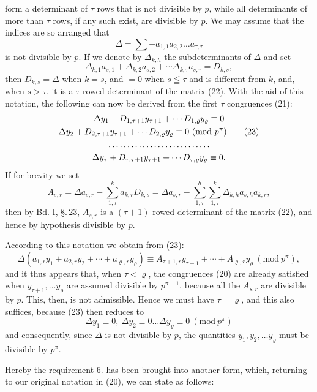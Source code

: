 form a determinant of $\tau$ rows that is not divisible by $p$, while all determinants of more than $\tau$ rows,
if any such exist, are divisible by $p$. We may
assume that the indices are so arranged that
\[
\Delta = \sum \pm a_{1,1}a_{2,2} \dots a_{\tau,\tau}
\]
is not divisible by $p$. If we denote by $\Delta_{k,h}$ the subdeterminants of $\Delta$ and set
\[
\Delta_{k,1}a_{s,1} + \Delta_{k,2}a_{s,2} + \cdots \Delta_{k,\tau}a_{s,\tau} = D_{k,s},
\]
then $D_{k,s} = \Delta$ when $k = s$, and $= 0$ when $s \leqq \tau$ and is different from
$k$, and, when $s > \tau$, it is a $\tau$-rowed determinant of the matrix (22). With the aid of this notation, the following can
now be derived from the first $\tau$ congruences (21):
\begin{gather}
\Delta y_1 + D_{1,\tau+1}y_{\tau+1} + \cdots D_{1,\varrho}y_\varrho \equiv 0 \notag\\
\Delta y_2 + D_{2,\tau+1}y_{\tau+1} + \cdots D_{2,\varrho}y_\varrho \equiv 0\ (\mathrm{mod}\ p^\pi) \tag{23}\\
\dots\dots\dots\dots\dots\dots\dots\dots\dots \notag\\
\Delta y_\tau + D_{\tau,\tau+1}y_{\tau+1} + \cdots D_{\tau,\varrho}y_\varrho \equiv 0. \notag
\end{gather}
If for brevity we set
\[
A_{s,r} = \Delta a_{s,r} - \sum_{1,\tau}^{k} a_{k,r}D_{k,s} = \Delta a_{s,r} - \sum_{1,\tau}^{h}\sum_{1,\tau}^{k} \Delta_{k,h}a_{s,h}a_{k,r},
\]
then by Bd. I, \S.\,23, $A_{s,r}$ is a $(\tau+1)$-rowed determinant of the
matrix (22), and hence by hypothesis divisible by $p$.

    According to this notation we obtain from (23):
\[
\Delta (a_{1,r}y_1 + a_{2,r}y_2 + \cdots + a_{\varrho,r}y_\varrho)
\equiv A_{\tau+1,r}y_{\tau+1} + \cdots + A_{\varrho,r}y_\varrho\ (\mathrm{mod}\ p^\pi),
\]
and it thus appears that, when $\tau < \varrho$, the congruences (20)
are already satisfied when $y_{\tau+1}, \dots y_\varrho$ are assumed divisible by $p^{\pi-1}$, because all the $A_{s,r}$ are divisible by $p$. This,
then, is not admissible. Hence we must have $\tau = \varrho$, and this also
suffices, because (23) then reduces to
\[
\Delta y_1 \equiv 0,\ \Delta y_2 \equiv 0 \dots \Delta y_\varrho \equiv 0\ (\mathrm{mod}\ p^\pi)
\]
and consequently, since $\Delta$ is not divisible by $p$, the quantities $y_1, y_2, \dots y_\varrho$
must be divisible by $p^\pi$.

    Hereby the requirement 6. has been brought into another form, which, returning to our original notation
in (20), we can state as follows:

